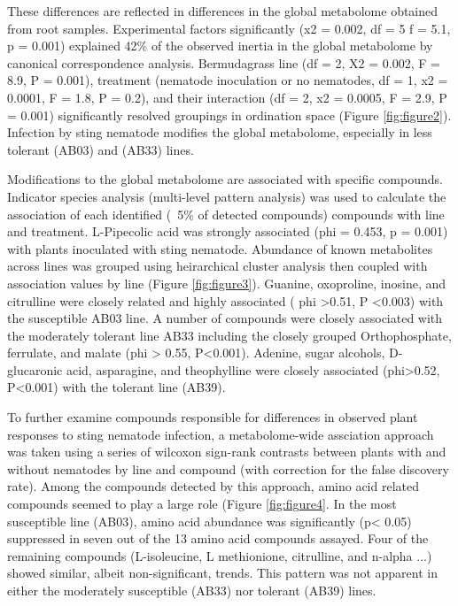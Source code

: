 \documentclass[9pt,lineno]{elife}
\begin{document}
These differences are reflected in differences in the global metabolome obtained from root samples.  Experimental factors significantly (x2 = 0.002, df = 5 f = 5.1, p = 0.001) explained 42\% of the observed inertia in the global metabolome by canonical correspondence analysis.  Bermudagrass line (df = 2, X2 = 0.002, F = 8.9, P = 0.001), treatment (nematode inoculation or no nematodes, df = 1, x2 = 0.0001, F = 1.8, P = 0.2), and their interaction (df = 2, x2 = 0.0005, F = 2.9, P = 0.001) significantly resolved groupings in ordination space (Figure \ref{fig:figure2}).  Infection by sting nematode modifies the global metabolome, especially in less tolerant (AB03) and (AB33) lines.

Modifications to the global metabolome are associated with specific compounds.  Indicator species analysis (multi-level pattern analysis) was used to calculate the association of each identified (~5\% of detected compounds) compounds with line and treatment.  L-Pipecolic acid was strongly associated (phi = 0.453, p = 0.001) with plants inoculated with sting nematode.  Abundance of known metabolites across lines was grouped using heirarchical cluster analysis then coupled with association values by line (Figure \ref{fig:figure3}).  Guanine, oxoproline, inosine, and citrulline were closely related and highly associated ( phi >0.51, P <0.003) with the susceptible AB03 line.  A number of compounds were closely associated with the moderately tolerant line AB33 including the closely grouped Orthophosphate, ferrulate, and malate (phi > 0.55, P<0.001). Adenine, sugar alcohols, D-glucaronic acid, asparagine, and theophylline were closely associated (phi>0.52, P<0.001) with the tolerant line (AB39).  

To further examine compounds responsible for differences in observed plant responses to sting nematode infection, a metabolome-wide assciation approach was taken using a series of wilcoxon sign-rank contrasts between plants with and without nematodes by line and compound (with correction for the false discovery rate).  Among the compounds detected by this approach, amino acid related compounds seemed to play a large role (Figure \ref{fig:figure4}.  In the most susceptible line (AB03), amino acid abundance was significantly (p< 0.05) suppressed in seven out of the 13 amino acid compounds assayed.  Four of the remaining compounds (L-isoleucine, L methionione, citrulline, and n-alpha ...) showed similar, albeit non-significant, trends.  This pattern was not apparent in either the moderately susceptible (AB33) nor tolerant (AB39) lines.  
\end{document}
